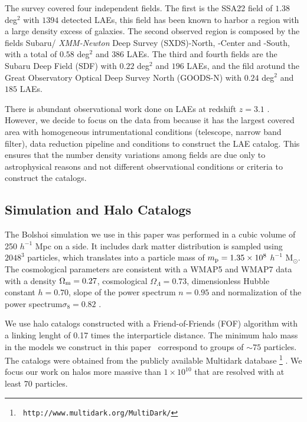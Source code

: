 \documentclass[usenatbib]{mn2e}
\newcommand{\documentname}{paper~}
\newcommand{\hMsun}{{\ifmmode{h^{-1}{\rm {M_{\odot}}}}\else{$h^{-1}{\rm{M_{\odot}}}$}\fi}}
\begin{document}
The survey covered four independent fields. The first is the SSA22
field of $1.38$ deg$^2$ with $1394$ detected LAEs, this field has been
known to harbor a region with a large density excess of galaxies. The
second observed region is composed by the fields Subaru/{\it
  XMM-Newton} Deep Survey (SXDS)-North, -Center and -South, with a 
total of $0.58$ deg$^2$ and $386$ LAEs. The third and fourth fields
are the Subaru Deep Field (SDF) with $0.22$ deg$^2$ and $196$ LAEs,
and the fild arotund the Great Observatory Optical Deep Survey North
(GOODS-N) with $0.24$ deg$^2$ and $185$ LAEs. 

There is abundant observational work done on LAEs at redshift $z=3.1$
\citep{Kudritzki2000,Matsuda2005,Gawiser2007,Nilsson2007,Ouchi2008}.
However, we decide to focus on the data from \cite{Yamada2012} because
it has the largest covered area with homogeneous intrumentational
conditions (telescope, narrow band filter), data reduction pipeline
and conditions to construct the LAE catalog. This ensures that the
number density variations among fields are due only to
astrophysical reasons and not different observational conditions or
criteria to construct the catalogs.

\subsection{Simulation and Halo Catalogs}

The Bolshoi simulation \citep{Bolshoi} we use in this paper was
performed in a cubic volume of 250 $h^{-1}$ Mpc on a side. It includes
dark matter distribution is sampled using $2048^{3}$ particles, which
translates into a particle mass of $m_{\rm   p}=1.35\times 10^{8}$
$h^{-1}$ M$_{\odot}$.  The cosmological parameters are consistent with
a WMAP5 and WMAP7 data with a  density $\Omega_{\rm m} = 0.27$,
cosmological  $\Omega_{\Lambda}=0.73$, dimensionless Hubble constant
$h=0.70$, slope of the power spectrum $n=0.95$ and normalization of the
power spectrum$\sigma_{8}=0.82$ \citep{Komatsu2009,Jarosik2011}.  

We use halo catalogs constructed with a Friend-of-Friends (FOF)
algorithm with a linking lenght of 0.17 times the interparticle
distance. The minimum halo mass in the models we construct in this \documentname
correspond to groups of $\sim 75$ particles. The catalogs were
obtained from the publicly available Multidark database \footnote{{\tt
    http://www.multidark.org/MultiDark/}} \citep{2011arXiv1109.0003R}.
We focus our work on halos more massive than $1\times 10^{10}$\hMsun
that are resolved with at least $70$ particles.
\end{document}
